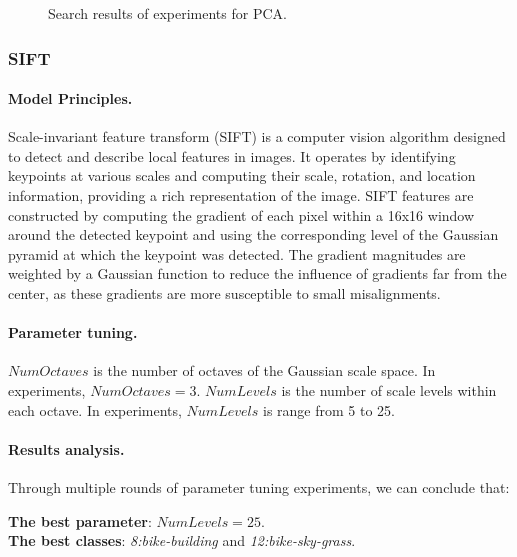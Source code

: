 \documentclass{article}
\begin{document}
\begin{figure}[!tbp]
  \centering
  \hfill
  \hfill
  \caption{\label{fig:PCAResult} Search results of experiments for PCA.}
\end{figure}


\subsubsection{SIFT}

\paragraph{Model Principles.}
Scale-invariant feature transform (SIFT) is a computer vision algorithm designed to detect and describe local features in images. It operates by identifying keypoints at various scales and computing their scale, rotation, and location information, providing a rich representation of the image. SIFT features are constructed by computing the gradient of each pixel within a 16x16 window around the detected keypoint and using the corresponding level of the Gaussian pyramid at which the keypoint was detected. The gradient magnitudes are weighted by a Gaussian function to reduce the influence of gradients far from the center, as these gradients are more susceptible to small misalignments.

\paragraph{Parameter tuning.}
$NumOctaves$ is the number of octaves of the Gaussian scale space. In experiments, $NumOctaves = 3$.
$NumLevels$ is the number of scale levels within each octave. In experiments, $NumLevels$ is range from 5 to 25.

\paragraph{Results analysis.}
Through multiple rounds of parameter tuning experiments, we can conclude that:

\noindent \textbf{The best parameter}: $NumLevels = 25$. \\
\textbf{The best classes}: \textit{8:bike-building} and \textit{12:bike-sky-grass}.
\end{document}
